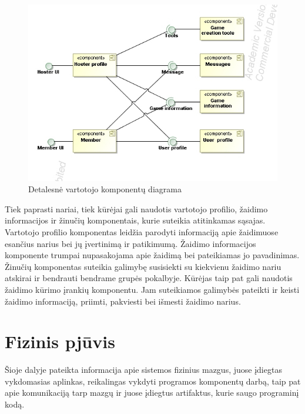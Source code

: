 \documentclass{VUMIFPSkursinis}
\begin{document}
		\begin{figure}[H]
			\centering
			\includegraphics[scale=0.6]{img/UMLComponent3}
			\caption{Detalesnė vartotojo komponentų diagrama}
			\label{img:UMLComponent3}
		\end{figure}
		Tiek paprasti nariai, tiek kūrėjai gali naudotis vartotojo profilio, žaidimo informacijos ir žinučių komponentais, kurie suteikia atitinkamas sąsajas. Vartotojo profilio komponentas leidžia parodyti informaciją apie žaidimuose esančius narius bei jų įvertinimą ir patikimumą. Žaidimo informacijos komponente trumpai nupasakojama apie žaidimą bei pateikiamas jo pavadinimas. Žinučių komponentas suteikia galimybę susisiekti su kiekvienu žaidimo nariu atskirai ir bendrauti bendrame grupės pokalbyje. Kūrėjas taip pat gali naudotis žaidimo kūrimo įrankių komponentu. Jam suteikiamos galimybės pateikti ir keisti žaidimo informaciją, priimti, pakviesti bei išmesti žaidimo narius.

\section{Fizinis pjūvis}
Šioje dalyje pateikta informacija apie sistemos fizinius mazgus, juose įdiegtas vykdomasias aplinkas, reikalingas vykdyti programos komponentų darbą, taip pat apie komunikaciją tarp mazgų ir juose įdiegtus artifaktus, kurie saugo programinį kodą.
\end{document}
